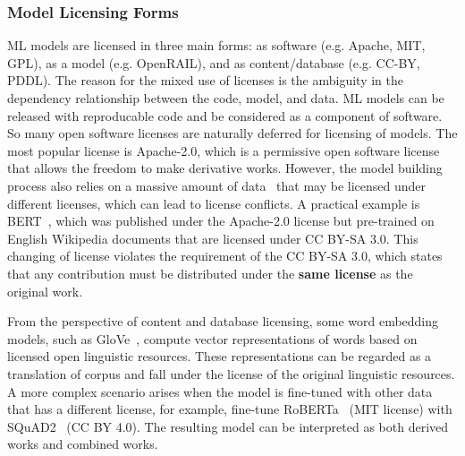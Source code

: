 \subsubsection{Model Licensing Forms}
\label{sec:licensing}
ML models are licensed in three main forms: as software (e.g. Apache, MIT, GPL), as a model (e.g. OpenRAIL), and as content/database (e.g. CC-BY, PDDL).
The reason for the mixed use of licenses is the ambiguity in the dependency relationship between the code, model, and data.
ML models can be released with reproducable code and be considered as a component of software.
So many open software licenses are naturally deferred for licensing of models.
The most popular license is Apache-2.0, which is a permissive open software license that allows the freedom to make derivative works.
However, the model building process also relies on a massive amount of data~\cite{lecun2015deep} that may be licensed under different licenses, which can lead to license conflicts.
A practical example is BERT~\cite{devlin2018bert}, which was published under the Apache-2.0 license but pre-trained on English Wikipedia documents that are licensed under CC BY-SA 3.0.
This changing of license violates the requirement of the CC BY-SA 3.0, which states that any contribution must be distributed under the \textbf{same license} as the original work.


From the perspective of content and database licensing, some word embedding models, such as GloVe~\cite{pennington2014glove}, compute vector representations of words based on licensed open linguistic resources.
These representations can be regarded as a translation of corpus and fall under the license of the original linguistic resources.
A more complex scenario arises when the model is fine-tuned with other data that has a different license, for example, fine-tune RoBERTa~\cite{liu2019roberta} (MIT license) with SQuAD2~\cite{rajpurkar2016squad} (CC BY 4.0).
The resulting model can be interpreted as both derived works and combined works.

